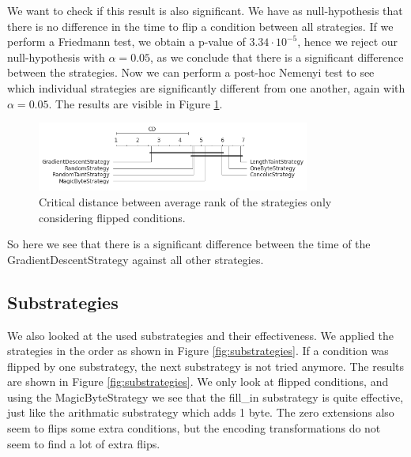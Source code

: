 We want to check if this result is also significant.
We have as null-hypothesis that there is no difference in the time to flip a condition between all strategies. If we perform a Friedmann test, we obtain a p-value of $3.34 \cdot 10^{-5}$, hence we reject our null-hypothesis with $\alpha = 0.05$, as we conclude that there is a significant difference between the strategies. Now we can perform a post-hoc Nemenyi test to see which individual strategies are significantly different from one another, again with  $\alpha = 0.05$. The results are visible in Figure \ref{fig:cd-strategies-with-rank}.
\begin{figure}[H]
    \centering
    \includegraphics[width=0.8\textwidth]{5_results/graphs_new/CD_rank_timing.png}  
    \caption{Critical distance between average rank of the strategies only considering flipped conditions.}
    \label{fig:cd-strategies-with-rank}
\end{figure}
So here we see that there is a significant difference between the time of the GradientDescentStrategy against all other strategies.

\subsection{Substrategies}
We also looked at the used substrategies and their effectiveness.
We applied the strategies in the order as shown in Figure \ref{fig:substrategies}. If a condition was flipped by one substrategy, the next substrategy is not tried anymore. The results are shown in Figure \ref{fig:substrategies}.
We only look at flipped conditions, and using the MagicByteStrategy we see that the fill\_in substrategy is quite effective, just like the arithmatic substrategy which adds 1 byte. The zero extensions also seem to flips some extra conditions, but the encoding transformations do not seem to find a lot of extra flips.

